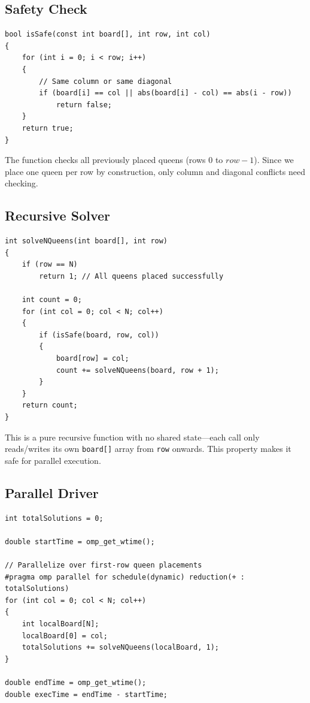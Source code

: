 \documentclass[11pt]{article}
\begin{document}
\subsection{Safety Check}

\begin{codebox}
\begin{lstlisting}
bool isSafe(const int board[], int row, int col)
{
    for (int i = 0; i < row; i++)
    {
        // Same column or same diagonal
        if (board[i] == col || abs(board[i] - col) == abs(i - row))
            return false;
    }
    return true;
}
\end{lstlisting}
\end{codebox}

The function checks all previously placed queens (rows $0$ to $row-1$). Since we place one queen per row by construction, only column and diagonal conflicts need checking.

\subsection{Recursive Solver}

\begin{codebox}
\begin{lstlisting}
int solveNQueens(int board[], int row)
{
    if (row == N)
        return 1; // All queens placed successfully

    int count = 0;
    for (int col = 0; col < N; col++)
    {
        if (isSafe(board, row, col))
        {
            board[row] = col;
            count += solveNQueens(board, row + 1);
        }
    }
    return count;
}
\end{lstlisting}
\end{codebox}

This is a pure recursive function with no shared state---each call only reads/writes its own \texttt{board[]} array from \texttt{row} onwards. This property makes it safe for parallel execution.

\subsection{Parallel Driver}

\begin{codebox}
\begin{lstlisting}
int totalSolutions = 0;

double startTime = omp_get_wtime();

// Parallelize over first-row queen placements
#pragma omp parallel for schedule(dynamic) reduction(+ : totalSolutions)
for (int col = 0; col < N; col++)
{
    int localBoard[N];
    localBoard[0] = col;
    totalSolutions += solveNQueens(localBoard, 1);
}

double endTime = omp_get_wtime();
double execTime = endTime - startTime;
\end{lstlisting}
\end{codebox}
\end{document}
